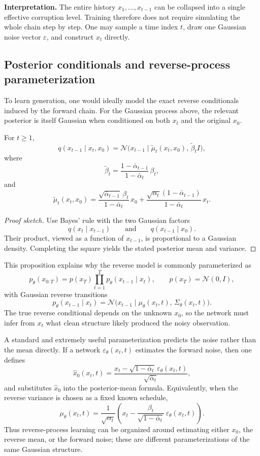 \noindent
\textbf{Interpretation.}
The entire history $x_1,\dots,x_{t-1}$ can be collapsed into a single effective corruption level.
Training therefore does not require simulating the whole chain step by step.
One may sample a time index $t$, draw one Gaussian noise vector $\varepsilon$, and construct $x_t$ directly.

\subsection*{Posterior conditionals and reverse-process parameterization}

To learn generation, one would ideally model the exact reverse conditionals induced by the forward chain.
For the Gaussian process above, the relevant posterior is itself Gaussian when conditioned on both $x_t$ and the original $x_0$.

\begin{proposition}
For $t\ge 1$,
\[
q(x_{t-1}\mid x_t,x_0)
=
\mathcal{N}\!\bigl(x_{t-1}\mid \tilde\mu_t(x_t,x_0),\,\tilde\beta_t I\bigr),
\]
where
\[
\tilde\beta_t = \frac{1-\bar\alpha_{t-1}}{1-\bar\alpha_t}\,\beta_t,
\]
and
\[
\tilde\mu_t(x_t,x_0)
=
\frac{\sqrt{\bar\alpha_{t-1}}\,\beta_t}{1-\bar\alpha_t}\,x_0
+
\frac{\sqrt{\alpha_t}(1-\bar\alpha_{t-1})}{1-\bar\alpha_t}\,x_t.
\]
\end{proposition}

\begin{proof}[Proof sketch]
Use Bayes' rule with the two Gaussian factors
\[
q(x_t\mid x_{t-1})
\qquad \text{and} \qquad
q(x_{t-1}\mid x_0).
\]
Their product, viewed as a function of $x_{t-1}$, is proportional to a Gaussian density.
Completing the square yields the stated posterior mean and variance.
\end{proof}

This proposition explains why the reverse model is commonly parameterized as
\[
p_\theta(x_{0:T}) = p(x_T)\prod_{t=1}^T p_\theta(x_{t-1}\mid x_t),
\qquad p(x_T)=\mathcal{N}(0,I),
\]
with Gaussian reverse transitions
\[
p_\theta(x_{t-1}\mid x_t)
=
\mathcal{N}\!\bigl(x_{t-1}\mid \mu_\theta(x_t,t),\,\Sigma_\theta(x_t,t)\bigr).
\]
The true reverse conditional depends on the unknown $x_0$, so the network must infer from $x_t$ what clean structure likely produced the noisy observation.

A standard and extremely useful parameterization predicts the noise rather than the mean directly.
If a network $\varepsilon_\theta(x_t,t)$ estimates the forward noise, then one defines
\[
\hat x_0(x_t,t)
=
\frac{x_t-\sqrt{1-\bar\alpha_t}\,\varepsilon_\theta(x_t,t)}{\sqrt{\bar\alpha_t}},
\]
and substitutes $\hat x_0$ into the posterior-mean formula.
Equivalently, when the reverse variance is chosen as a fixed known schedule,
\[
\mu_\theta(x_t,t)
=
\frac{1}{\sqrt{\alpha_t}}
\left(
 x_t - \frac{\beta_t}{\sqrt{1-\bar\alpha_t}}\,\varepsilon_\theta(x_t,t)
\right).
\]
Thus reverse-process learning can be organized around estimating either $x_0$, the reverse mean, or the forward noise; these are different parameterizations of the same Gaussian structure.


